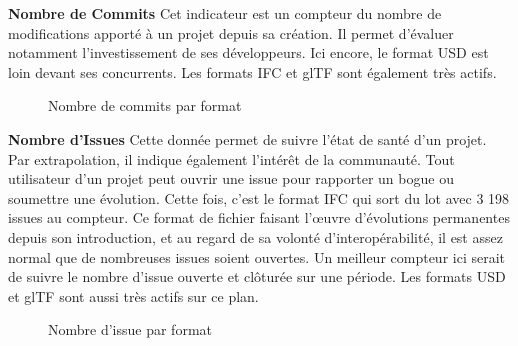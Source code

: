 \textbf{Nombre de Commits}
Cet indicateur est un compteur du nombre de modifications apporté à un projet depuis sa création. Il permet d'évaluer notamment l'investissement de ses développeurs.
Ici encore, le format USD est loin devant ses concurrents. Les formats IFC et glTF sont également très actifs. 

\begin{figure}[!h]
    \centering
    \caption{Nombre de commits par format}
    \label{fig:mon_graphique}
\end{figure}

\textbf{Nombre d'Issues}
Cette donnée permet de suivre l'état de santé d'un projet. Par extrapolation, il indique également l'intérêt de la communauté. Tout utilisateur d'un projet peut ouvrir une issue pour rapporter un bogue ou soumettre une évolution.
Cette fois, c'est le format IFC qui sort du lot avec 3 198 issues au compteur. Ce format de fichier faisant l'œuvre d'évolutions permanentes depuis son introduction, et au regard de sa volonté d'interopérabilité, il est assez normal que de nombreuses issues soient ouvertes. Un meilleur compteur ici serait de suivre le nombre d'issue ouverte et clôturée sur une période.
Les formats USD et glTF sont aussi très actifs sur ce plan.

\begin{figure}[!h]
    \centering
    \caption{Nombre d'issue par format}
    \label{fig:mon_graphique}
\end{figure}

